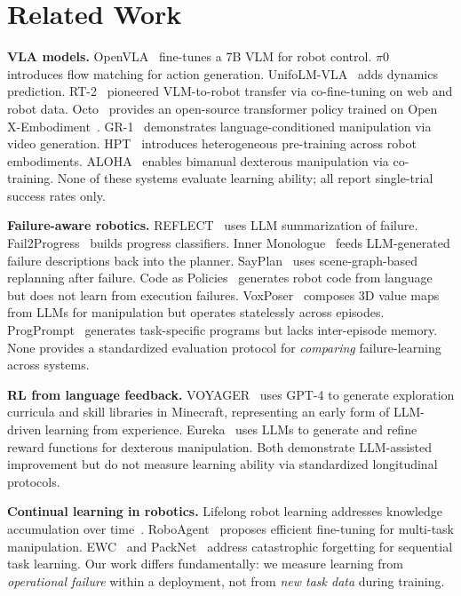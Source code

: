 ﻿\documentclass{article}
\begin{document}
\section{Related Work}
\label{sec:related}

\textbf{VLA models.}
OpenVLA~\citep{kim2024openvla} fine-tunes a 7B VLM for robot control.
$\pi$0~\citep{pi02024} introduces flow matching for action generation.
UnifoLM-VLA~\citep{unitree2026unifolm} adds dynamics prediction.
RT-2~\citep{brohan2023rt2} pioneered VLM-to-robot transfer via co-fine-tuning on web and robot data.
Octo~\citep{team2024octo} provides an open-source transformer policy trained on Open X-Embodiment~\citep{padalkar2023openx}.
GR-1~\citep{wu2023gr1} demonstrates language-conditioned manipulation via video generation.
HPT~\citep{wang2024hpt} introduces heterogeneous pre-training across robot embodiments.
ALOHA~\citep{zhao2023aloha} enables bimanual dexterous manipulation via co-training.
None of these systems evaluate learning ability; all report single-trial success rates only.

\textbf{Failure-aware robotics.}
REFLECT~\citep{liu2023reflect} uses LLM summarization of failure.
Fail2Progress~\citep{fail2progress2025} builds progress classifiers.
Inner Monologue~\citep{huang2022inner} feeds LLM-generated failure descriptions back into the planner.
SayPlan~\citep{rana2023sayplan} uses scene-graph-based replanning after failure.
Code as Policies~\citep{liang2023code} generates robot code from language but does not learn from execution failures.
VoxPoser~\citep{huang2023voxposer} composes 3D value maps from LLMs for manipulation but operates statelessly across episodes.
ProgPrompt~\citep{singh2023progprompt} generates task-specific programs but lacks inter-episode memory.
None provides a standardized evaluation protocol for \emph{comparing} failure-learning across systems.

\textbf{RL from language feedback.}
VOYAGER~\citep{wang2023voyager} uses GPT-4 to generate exploration curricula and skill libraries in Minecraft, representing an early form of LLM-driven learning from experience.
Eureka~\citep{ma2024eureka} uses LLMs to generate and refine reward functions for dexterous manipulation.
Both demonstrate LLM-assisted improvement but do not measure learning ability via standardized longitudinal protocols.

\textbf{Continual learning in robotics.}
Lifelong robot learning addresses knowledge accumulation over time~\citep{liu2024libero, thrun1995lifelong}.
RoboAgent~\citep{bharadhwaj2024roboagent} proposes efficient fine-tuning for multi-task manipulation.
EWC~\citep{kirkpatrick2017ewc} and PackNet~\citep{mallya2018packnet} address catastrophic forgetting for sequential task learning.
Our work differs fundamentally: we measure learning from \emph{operational failure} within a deployment, not from \emph{new task data} during training.
\end{document}
